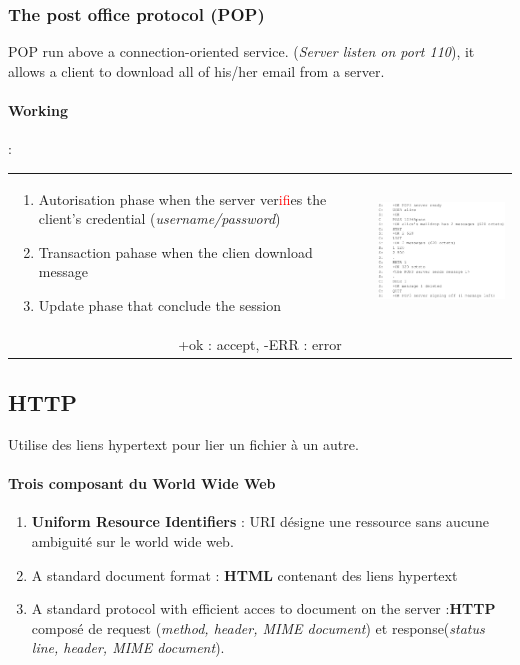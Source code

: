 \subsubsection{The post office protocol (POP) }
POP run above a connection-oriented service. (\textit{Server listen on port 110}), it allows a client to download all of his/her email from a server.

\paragraph{Working} :

\begin{tabular}{m{9cm}m{6cm}}
\begin{enumerate}
    \item Autorisation phase when the server ver\textcolor{red}{if}ies the client's credential 
        (\textit{username/password})
    \item Transaction pahase when the clien download message
    \item Update phase that conclude the session
\end{enumerate}
&
\includegraphics[width=7cm]{pop.png} \\
\multicolumn{2}{c}{+ok : accept, -ERR : error}
\end{tabular}


\subsection{HTTP}
Utilise des liens hypertext pour lier un fichier à un autre.

\paragraph{Trois composant du \textbf{World Wide Web}}
\begin{enumerate}
    \item \textbf{Uniform Resource Identifiers} : URI désigne une ressource sans aucune ambiguité
sur le world wide web.
    \item A standard document format : \textbf{HTML} contenant des liens hypertext
    \item A standard protocol with efficient acces to document on the server :\textbf{HTTP} composé de request (\textit{method, header, MIME document}) et response(\textit{status line, header, MIME document}).
\end{enumerate}

